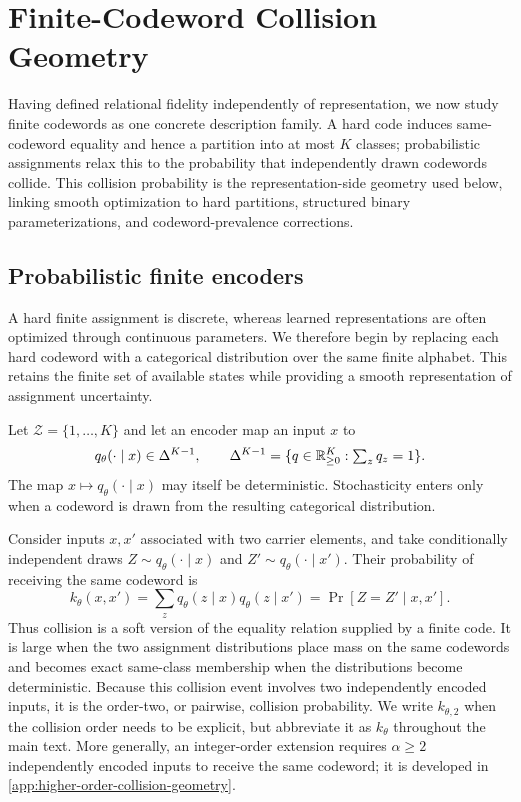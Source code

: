 \section{Finite-Codeword Collision Geometry}
\label{sec:collision-geometry}

Having defined relational fidelity independently of representation, we now study finite codewords as one concrete description family.
A hard code induces same-codeword equality and hence a partition into at most $K$ classes; probabilistic assignments relax this to the probability that independently drawn codewords collide.
This collision probability is the representation-side geometry used below, linking smooth optimization to hard partitions, structured binary parameterizations, and codeword-prevalence corrections.


\subsection{Probabilistic finite encoders}

A hard finite assignment is discrete, whereas learned representations are often optimized through continuous parameters.
We therefore begin by replacing each hard codeword with a categorical distribution over the same finite alphabet.
This retains the finite set of available states while providing a smooth representation of assignment uncertainty.

Let $\mathcal Z=\{1,\ldots,K\}$ and let an encoder map an input $x$ to
\begin{equation}
q_\theta(\cdot\mid x)\in\Delta^{K-1},\qquad
\Delta^{K-1}=\{q\in\mathbb{R}_{\ge0}^K:\textstyle\sum_z q_z=1\}.
\label{eq:discrete-encoder}
\end{equation}
The map $x\mapsto q_\theta(\cdot\mid x)$ may itself be deterministic.
Stochasticity enters only when a codeword is drawn from the resulting categorical distribution.

Consider inputs $x,x'$ associated with two carrier elements, and take conditionally independent draws
$Z\sim q_\theta(\cdot\mid x)$ and
$Z'\sim q_\theta(\cdot\mid x')$.
Their probability of receiving the same codeword is
\begin{equation}
k_\theta(x,x')
=\sum_zq_\theta(z\mid x)q_\theta(z\mid x')
=\Pr[Z=Z'\mid x,x'].
\label{eq:collision-kernel}
\end{equation}
Thus collision is a soft version of the equality relation supplied by a finite code.
It is large when the two assignment distributions place mass on the same codewords and becomes exact same-class membership when the distributions become deterministic.
Because this collision event involves two independently encoded inputs, it is the order-two, or pairwise, collision probability.
We write $k_{\theta,2}$ when the collision order needs to be explicit, but abbreviate it as $k_\theta$ throughout the main text.
More generally, an integer-order extension requires $\alpha\ge2$ independently encoded inputs to receive the same codeword; it is developed in \ref{app:higher-order-collision-geometry}.


